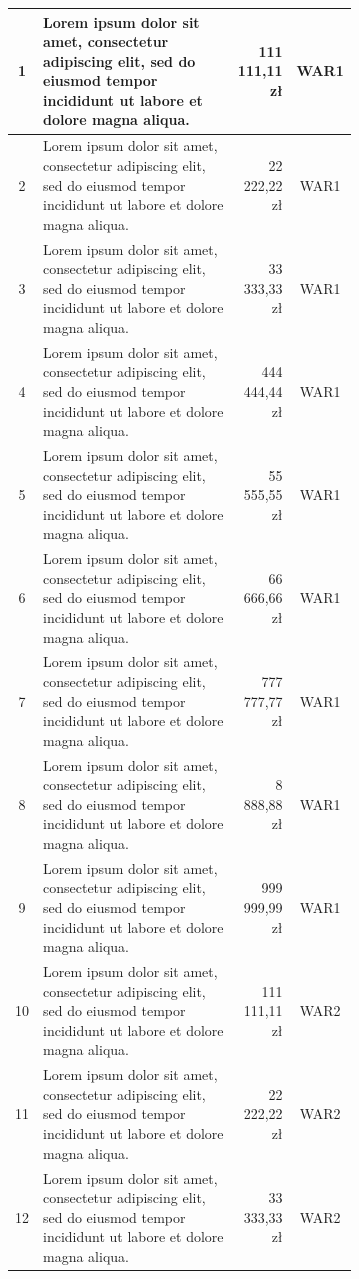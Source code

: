 \documentclass[
    left=2.5cm,         %
    right=2.5cm,        %
    top=2.5cm,          %
    bottom=3cm,         %
    bindingoffset=6mm,  %
    nohyphenation=true %
]{eiti/eiti-thesis} %
\begin{document}
\begin{longtable}{| c | m{0.58\linewidth} | r | m{0.1\linewidth} |}
	1 & Lorem ipsum dolor sit amet, consectetur adipiscing elit, sed do eiusmod tempor incididunt ut labore et dolore magna aliqua. & 111 111,11 zł & \multicolumn{1}{c|}{WAR1} \\ \hline
	2 & Lorem ipsum dolor sit amet, consectetur adipiscing elit, sed do eiusmod tempor incididunt ut labore et dolore magna aliqua. & 22 222,22 zł & \multicolumn{1}{c|}{WAR1} \\ \hline
	3 & Lorem ipsum dolor sit amet, consectetur adipiscing elit, sed do eiusmod tempor incididunt ut labore et dolore magna aliqua. & 33 333,33 zł & \multicolumn{1}{c|}{WAR1} \\ \hline
	4 & Lorem ipsum dolor sit amet, consectetur adipiscing elit, sed do eiusmod tempor incididunt ut labore et dolore magna aliqua. & 444 444,44 zł & \multicolumn{1}{c|}{WAR1} \\ \hline
	5 & Lorem ipsum dolor sit amet, consectetur adipiscing elit, sed do eiusmod tempor incididunt ut labore et dolore magna aliqua. & 55 555,55 zł & \multicolumn{1}{c|}{WAR1} \\ \hline
	6 & Lorem ipsum dolor sit amet, consectetur adipiscing elit, sed do eiusmod tempor incididunt ut labore et dolore magna aliqua. & 66 666,66 zł & \multicolumn{1}{c|}{WAR1} \\ \hline
	7 & Lorem ipsum dolor sit amet, consectetur adipiscing elit, sed do eiusmod tempor incididunt ut labore et dolore magna aliqua. & 777 777,77 zł & \multicolumn{1}{c|}{WAR1} \\ \hline
	8 & Lorem ipsum dolor sit amet, consectetur adipiscing elit, sed do eiusmod tempor incididunt ut labore et dolore magna aliqua. & 8 888,88 zł & \multicolumn{1}{c|}{WAR1} \\ \hline
	9 & Lorem ipsum dolor sit amet, consectetur adipiscing elit, sed do eiusmod tempor incididunt ut labore et dolore magna aliqua. & 999 999,99 zł & \multicolumn{1}{c|}{WAR1} \\ \hline
	10 & Lorem ipsum dolor sit amet, consectetur adipiscing elit, sed do eiusmod tempor incididunt ut labore et dolore magna aliqua. & 111 111,11 zł & \multicolumn{1}{c|}{WAR2} \\ \hline
	11 & Lorem ipsum dolor sit amet, consectetur adipiscing elit, sed do eiusmod tempor incididunt ut labore et dolore magna aliqua. & 22 222,22 zł & \multicolumn{1}{c|}{WAR2} \\ \hline
	12 & Lorem ipsum dolor sit amet, consectetur adipiscing elit, sed do eiusmod tempor incididunt ut labore et dolore magna aliqua. & 33 333,33 zł & \multicolumn{1}{c|}{WAR2} \\ \hline

\end{longtable}
\end{document}

